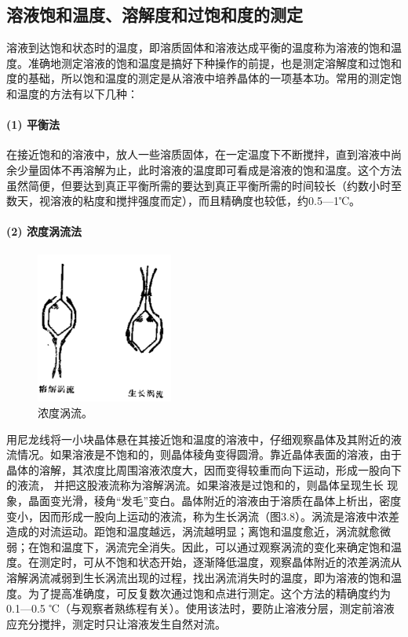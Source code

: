 ﻿\subsection{溶液饱和温度、溶解度和过饱和度的测定}
溶液到达饱和状态时的温度，即溶质固体和溶液达成平衡的温度称为溶液的饱和温度。准确地测定溶液的饱和温度是搞好下种操作的前提，也是测定溶解度和过饱和度的基础，所以饱和温度的测定是从溶液中培养晶体的一项基本功。常用的测定饱和温度的方法有以下几种：

\paragraph{(1) 平衡法}
在接近饱和的溶液中，放人一些溶质固体，在一定温度下不断搅拌，直到溶液中尚余少量固体不再溶解为止，此时溶液的温度即可看成是溶液的饱和温度。这个方法虽然简便，但要达到真正平衡所需的要达到真正平衡所需的时间较长（约数小时至数天，视溶液的粘度和搅拌强度而定），而且精确度也较低，约0.5—1℃。

\paragraph{(2) 浓度涡流法}
\begin{figure}[thb]
 \centering
 \includegraphics[width=0.4\textwidth]{fig/cp03/img3.8.jpg}
 \caption{浓度涡流。}
\end{figure}
用尼龙线将一小块晶体悬在其接近饱和温度的溶液中，仔细观察晶体及其附近的液流情况。如果溶液是不饱和的，则晶体稜角变得圆滑。靠近晶体表面的溶液，由于晶体的溶解，其浓度比周围溶液浓度大，因而变得较重而向下运动，形成一股向下的液流， 并把这股液流称为溶解涡流。如果溶液是过饱和的，则晶体呈现生长 现象，晶面变光滑，稜角“发毛”变白。晶体附近的溶液由于溶质在晶体上析出，密度变小，因而形成一股向上运动的液流，称为生长涡流（图3.8）。涡流是溶液中浓差造成的对流运动。距饱和温度越远，涡流越明显；离饱和温度愈近，涡流就愈微弱；在饱和温度下，涡流完全消失。因此，可以通过观察涡流的变化来确定饱和温度。在测定时，可从不饱和状态开始，逐渐降低温度，观察晶体附近的浓差涡流从溶解涡流减弱到生长涡流出现的过程，找出涡流消失时的温度，即为溶液的饱和温度。为了提高准确度，可反复数次通过饱和点进行测定。这个方法的精确度约为0.1—0.5 ℃（与观察者熟练程有关）。使用该法时，要防止溶液分层，测定前溶液应充分搅拌，测定时只让溶液发生自然对流。

